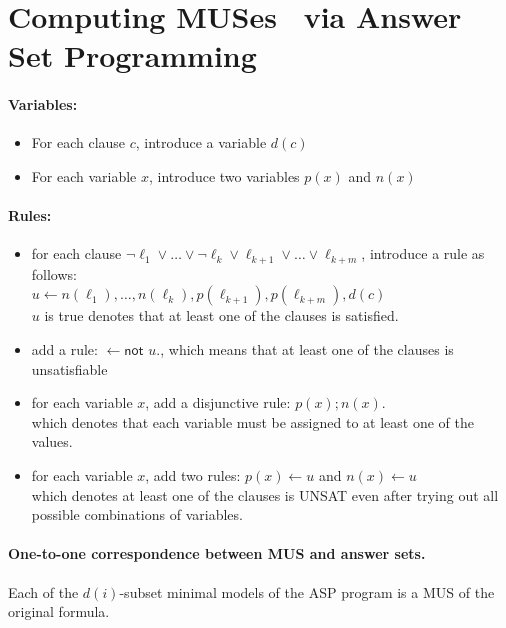 \documentclass{article}
\begin{document}
\newpage
\section{Computing MUSes~\cite{LPMM2016} via Answer Set Programming}
\paragraph{Variables:}
\begin{itemize}
    \item For each clause $c$, introduce a variable $d(c)$
    \item For each variable $x$, introduce two variables $p(x)$ and $n(x)$
\end{itemize}
\paragraph{Rules:}
\begin{itemize}
    \item for each clause $\neg{\ell_1} \vee \ldots \vee 
    \neg{\ell_k} \vee \ell_{k+1} \vee \ldots \vee \ell_{k+m}$, 
    introduce a rule as follows:\\
    $u \leftarrow n(\ell_1), \ldots, n(\ell_k), p(\ell_{k+1}), p(\ell_{k+m}), d(c)$\\
    $u$ is true denotes that at least one of the clauses is satisfied.
    \item add a rule: $\leftarrow \textsf{not } u.$,
    which means that at least one of the clauses is unsatisfiable
    \item for each variable $x$, add a disjunctive rule: $p(x) ; n(x).$\\
    which denotes that each variable must be assigned to at least one of the values.
    \item for each variable $x$, add two rules: $p(x) \leftarrow u$ and $n(x) \leftarrow u$\\
    which denotes at least one of the clauses is UNSAT even after trying out all possible combinations of variables.
\end{itemize}
\paragraph{One-to-one correspondence between MUS and answer sets.}
Each of the $d(i)$-subset minimal models of the ASP program is a MUS of the original formula. 


 

\end{document}
